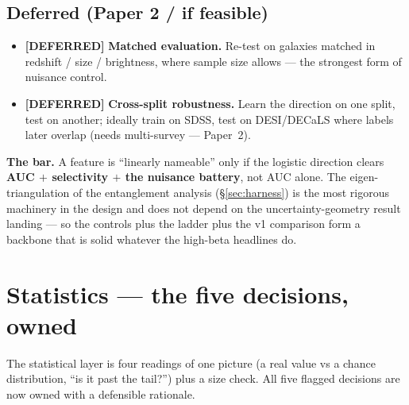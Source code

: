 \documentclass[11pt,a4paper]{article}
\newcommand{\dfr}{\textcolor{deferred}{\sffamily\bfseries[DEFERRED]}}
\begin{document}
\subsection{Deferred (Paper 2 / if feasible)}
\begin{itemize}[leftmargin=1.4em,itemsep=2pt]
\item \dfr{} \textbf{Matched evaluation.} Re-test on galaxies matched in redshift / size /
brightness, where sample size allows --- the strongest form of nuisance control.
\item \dfr{} \textbf{Cross-split robustness.} Learn the direction on one split, test on another;
ideally train on SDSS, test on DESI/DECaLS where labels later overlap (needs multi-survey ---
Paper~2).
\end{itemize}

\textbf{The bar.} A feature is ``linearly nameable'' only if the logistic direction clears
\textbf{AUC $+$ selectivity $+$ the nuisance battery}, not AUC alone. The eigen-triangulation of
the entanglement analysis (\S\ref{sec:harness}) is the most rigorous machinery in the design and
does not depend on the uncertainty-geometry result landing --- so the controls plus the ladder
plus the v1 comparison form a backbone that is solid whatever the high-beta headlines do.

\section{Statistics --- the five decisions, owned}\label{sec:stats}


The statistical layer is four readings of one picture (a real value vs a chance distribution,
``is it past the tail?'') plus a size check. All five flagged decisions are now owned with a
defensible rationale.
\end{document}
